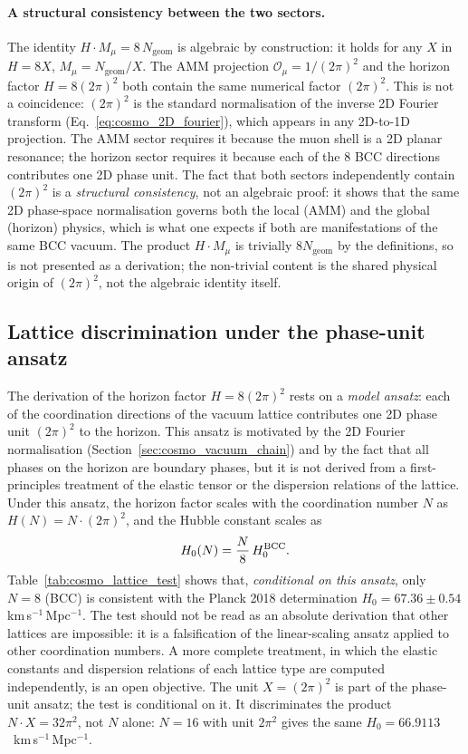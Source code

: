 \documentclass[10pt,a4paper]{article}
\begin{document}
\paragraph{A structural consistency between the two sectors.}
The identity \(H\cdot M_\mu = 8\,N_{\text{geom}}\) is algebraic by
construction: it holds for any \(X\) in \(H = 8X\),
\(M_\mu = N_{\text{geom}}/X\).
The AMM projection \(\mathcal{O}_\mu = 1/(2\pi)^2\) and the horizon
factor \(H = 8(2\pi)^2\) both contain the same numerical factor
\((2\pi)^2\). This is not a coincidence: \((2\pi)^2\) is the standard
normalisation of the inverse 2D Fourier transform
(Eq.~\eqref{eq:cosmo_2D_fourier}), which appears in any 2D-to-1D
projection. The AMM sector requires it because the muon shell is a
2D planar resonance; the horizon sector requires it because each of
the 8 BCC directions contributes one 2D phase unit. The fact that
both sectors independently contain \((2\pi)^2\) is a \emph{structural
	consistency}, not an algebraic proof: it shows that the same 2D
phase-space normalisation governs both the local (AMM) and the
global (horizon) physics, which is what one expects if both are
manifestations of the same BCC vacuum. The product \(H \cdot M_\mu\)
is trivially \(8 N_{\text{geom}}\) by the definitions, so is not
presented as a derivation; the non-trivial content is the shared
physical origin of \((2\pi)^2\), not the algebraic identity itself.

\subsection{Lattice discrimination under the phase-unit ansatz}
\label{sec:cosmo_lattice_test}

The derivation of the horizon factor \(H = 8(2\pi)^2\) rests on a
\emph{model ansatz}: each of the coordination directions of the
vacuum lattice contributes one 2D phase unit \((2\pi)^2\) to the
horizon. This ansatz is motivated by the 2D Fourier normalisation
(Section~\ref{sec:cosmo_vacuum_chain}) and by the fact that all
phases on the horizon are boundary phases, but it is not derived
from a first-principles treatment of the elastic tensor or the
dispersion relations of the lattice. Under this ansatz, the horizon
factor scales with the coordination number \(N\) as
\(H(N) = N \cdot (2\pi)^2\), and the Hubble constant scales as
\begin{equation}
	H_0(N) = \frac{N}{8}\,H_0^{\rm BCC}.
	\label{eq:cosmo_lattice_scaling}
\end{equation}
Table~\ref{tab:cosmo_lattice_test} shows that, \emph{conditional on
	this ansatz}, only \(N=8\) (BCC) is consistent with the Planck 2018
determination \(H_0 = 67.36 \pm 0.54\) km\,s\(^{-1}\)\,Mpc\(^{-1}\).
The test should not be read as an absolute derivation that other
lattices are impossible: it is a falsification of the linear-scaling
ansatz applied to other coordination numbers. A more complete
treatment, in which the elastic constants and dispersion relations
of each lattice type are computed independently, is an open
objective. The unit $X = (2\pi)^2$ is part of the phase-unit
ansatz; the test is conditional on it. It discriminates the product
$N\cdot X = 32\pi^2$, not $N$ alone: $N = 16$ with unit $2\pi^2$
gives the same $H_0 = 66.9113$~km\,s$^{-1}$\,Mpc$^{-1}$.
\end{document}
